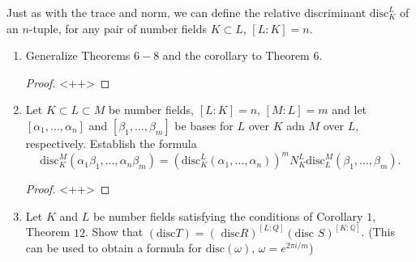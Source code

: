 \documentclass[12pt]{article}
\newcommand{\Q}{\mathbb{Q}}
\theoremstyle{definition}
\newenvironment{problem}[2][Problem]{\begin{trivlist}
\item[\hskip \labelsep {\bfseries #1}\hskip \labelsep {\bfseries #2.}]}{\end{trivlist}}
\begin{document}
\begin{problem}{23}
	Just as with the trace and norm, we can define the relative discriminant $\text{disc}_K^L$ of an $n$-tuple, for any pair of number fields $K \subset L$, $[L:K]=n$.
	\begin{enumerate}[label=(\alph*)]
		\item Generalize Theorems $6-8$ and the corollary to Theorem $6$.
			\begin{proof}
				<++>
			\end{proof}
		\item Let $K \subset L \subset M$ be number fields, $[L : K] = n$, $[M:L] = m$ and let $[\alpha_1, \dots , \alpha_n]$ and $[\beta_1, \dots , \beta_m]$ be bases for $L$ over $K$ adn $M$ over $L$, respectively. Establish the formula 
		\[\text{disc}_K^M(\alpha_1\beta_1, \dots , \alpha_n\beta_m) = (\text{disc}_K^L(\alpha_1, \dots , \alpha_n))^mN_K^L \text{disc}_L^M(\beta_1, \dots , \beta_m).\]
			\begin{proof}
				<++>
			\end{proof}
		\item Let $K$ and $L$ be number fields satisfying the conditions of Corollary $1$, Theorem $12$. Show that $(\text{disc} T) = (\text{ disc} R)^{[L:Q]}(\text{disc }S)^{[K:\Q]}$. (This can be used to obtain a formula for $\text{disc}(\omega)$, $\omega = e^{2 \pi i / m}$)
	\end{enumerate}
\end{problem}
\end{document}
